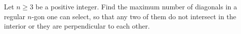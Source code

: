 Let 
$n \geq 3$
 be a positive integer. Find the maximum number of diagonals in a regular 
$n$-gon one can select, so that any two of them do not intersect in the interior or they are perpendicular to each other.
